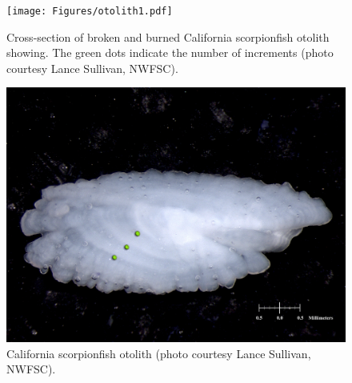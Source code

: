 \documentclass[12pt,]{article}
\begin{document}
\begin{figure}[htbp]
\centering
\texttt{[image: Figures/otolith1.pdf]}
\caption{Cross-section of broken and burned California scorpionfish
otolith showing. The green dots indicate the number of increments (photo
courtesy Lance Sullivan, NWFSC). \label{fig:otolith1}}
\end{figure}

\begin{figure}[htbp]
\centering
\includegraphics{Figures/otolith2.pdf}
\caption{California scorpionfish otolith (photo courtesy Lance Sullivan,
NWFSC). \label{fig:otolith2}}
\end{figure}

\FloatBarrier
\end{document}
